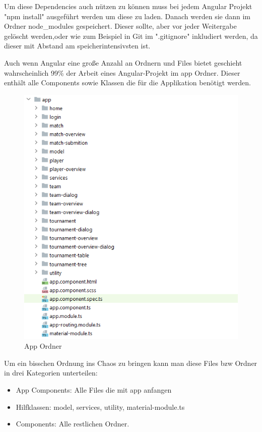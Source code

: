 Um diese Dependencies auch nützen zu können muss bei jedem Angular Projekt "npm install" ausgeführt werden um diese zu laden.
Danach werden sie dann im Ordner node\_modules gespeichert.
Dieser sollte, aber vor jeder Weitergabe gelöscht werden,oder wie zum Beispiel in Git im ".gitignore" inkludiert werden, da dieser mit Abstand am speicherintensivsten ist. 

\newpage
Auch wenn Angular eine große Anzahl an Ordnern und Files bietet geschieht wahrscheinlich 99\% der Arbeit eines Angular-Projekt im app Ordner.
Dieser enthält alle Components sowie Klassen die für die Applikation benötigt werden.

\begin{figure}[H]
    \includegraphics[scale=0.6]{pics/frontend/app_folder.PNG}
    \caption{App Ordner}
\end{figure}

Um ein bisschen Ordnung ins Chaos zu bringen kann man diese Files bzw Ordner in drei Kategorien unterteilen:
\begin{itemize}
    \item App Components: Alle Files die mit app anfangen
    \item Hilfklassen: model, services, utility, material-module.ts
    \item Components: Alle restlichen Ordner.
\end{itemize}

